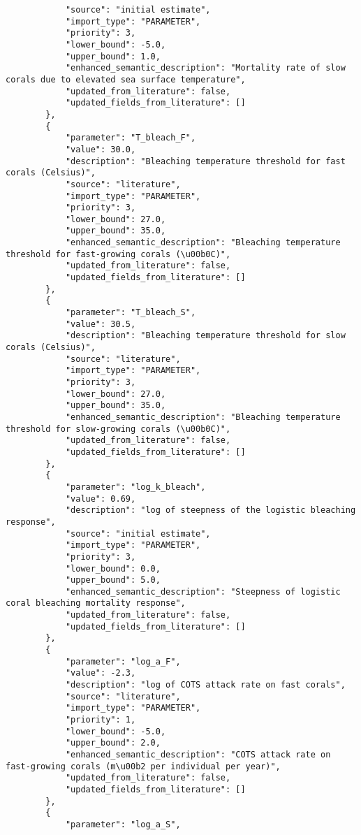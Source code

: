 \begin{lstlisting}
            "source": "initial estimate",
            "import_type": "PARAMETER",
            "priority": 3,
            "lower_bound": -5.0,
            "upper_bound": 1.0,
            "enhanced_semantic_description": "Mortality rate of slow corals due to elevated sea surface temperature",
            "updated_from_literature": false,
            "updated_fields_from_literature": []
        },
        {
            "parameter": "T_bleach_F",
            "value": 30.0,
            "description": "Bleaching temperature threshold for fast corals (Celsius)",
            "source": "literature",
            "import_type": "PARAMETER",
            "priority": 3,
            "lower_bound": 27.0,
            "upper_bound": 35.0,
            "enhanced_semantic_description": "Bleaching temperature threshold for fast-growing corals (\u00b0C)",
            "updated_from_literature": false,
            "updated_fields_from_literature": []
        },
        {
            "parameter": "T_bleach_S",
            "value": 30.5,
            "description": "Bleaching temperature threshold for slow corals (Celsius)",
            "source": "literature",
            "import_type": "PARAMETER",
            "priority": 3,
            "lower_bound": 27.0,
            "upper_bound": 35.0,
            "enhanced_semantic_description": "Bleaching temperature threshold for slow-growing corals (\u00b0C)",
            "updated_from_literature": false,
            "updated_fields_from_literature": []
        },
        {
            "parameter": "log_k_bleach",
            "value": 0.69,
            "description": "log of steepness of the logistic bleaching response",
            "source": "initial estimate",
            "import_type": "PARAMETER",
            "priority": 3,
            "lower_bound": 0.0,
            "upper_bound": 5.0,
            "enhanced_semantic_description": "Steepness of logistic coral bleaching mortality response",
            "updated_from_literature": false,
            "updated_fields_from_literature": []
        },
        {
            "parameter": "log_a_F",
            "value": -2.3,
            "description": "log of COTS attack rate on fast corals",
            "source": "literature",
            "import_type": "PARAMETER",
            "priority": 1,
            "lower_bound": -5.0,
            "upper_bound": 2.0,
            "enhanced_semantic_description": "COTS attack rate on fast-growing corals (m\u00b2 per individual per year)",
            "updated_from_literature": false,
            "updated_fields_from_literature": []
        },
        {
            "parameter": "log_a_S",

\end{lstlisting}
